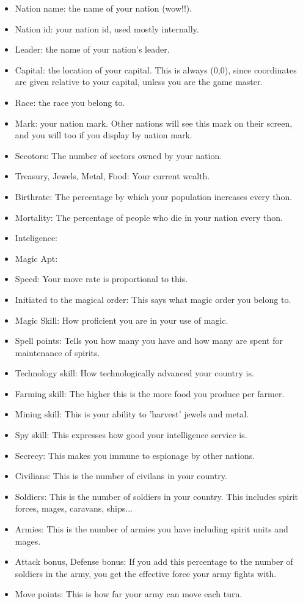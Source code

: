\begin{itemize}
\item
Nation name: the name of your nation (wow!!).
\item
Nation id: your nation id, used mostly internally.
\item
Leader: the name of your nation's leader.  
\item
Capital: the location of your capital.  This is always (0,0), since
coordinates are given relative to your capital, unless you are the game
master.
\item
Race: the race you belong to.
\item
Mark: your nation mark.  Other nations will see this mark on their screen,
and you will too if you display by nation mark.
\item
Secotors: The number of sectors owned by your nation.
\item
Treasury, Jewels, Metal, Food: Your current wealth.
\item
Birthrate: The percentage by which your population increases every thon.
\item
Mortality: The percentage of people who die in your nation every thon.
\item
Inteligence:
\item
Magic Apt:
\item
Speed: Your move rate is proportional to this.
\item
Initiated to the magical order:  This says what magic order you belong to.
\item 
Magic Skill: How proficient you are in your use of magic.
\item
Spell points: Tells you how many you have and how many are spent for 
maintenance of spirits.
\item
Technology skill: How technologically advanced your country is.
\item
Farming skill:  The higher this is the more food you produce per farmer.
\item
Mining skill: This is your ability to 'harvest' jewels and metal.
\item
Spy skill: This expresses how good your intelligence service is.
\item
Secrecy: This makes you immune to espionage by other nations.
\item
Civilians: This is the number of civilans in your country.
\item
Soldiers: This is the number of soldiers in your country.  This
includes spirit forces, mages, caravans, ships...
\item
Armies: This is the number of armies you have including spirit units
and mages.
\item
Attack bonus, Defense bonus: If you add this percentage to the number
of soldiers in the army, you get the effective force your army fights
with.
\item
Move points:  This is how far your army can move each turn.  
\end{itemize}

